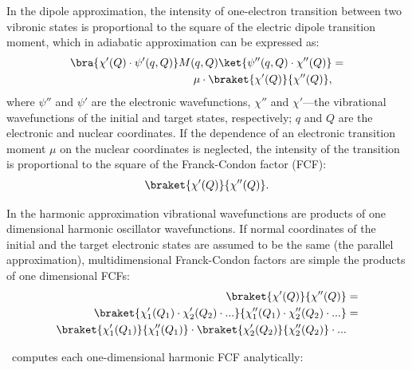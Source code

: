 \documentclass[11pt]{article}
\begin{document}
In the dipole approximation, the intensity of one-electron transition between two vibronic states
is proportional to the square of the electric dipole transition moment, which
in adiabatic approximation can be expressed as:
\begin{align}
\bra{\chi '(Q)\cdot\psi'(q,Q)} M(q,Q) \ket{\psi''(q,Q)\cdot\chi''(Q)} & = \nonumber\\
\mu \cdot \braket{\chi '(Q)}{\chi ''(Q)}, & 
\end{align}
where
$\psi''$ and $\psi'$ are the electronic wavefunctions, $\chi''$ and $\chi'$---the vibrational wavefunctions
of the initial and target states, respectively;
$q$ and $Q$ are the electronic and nuclear coordinates.
If the dependence 
of an electronic transition moment $\mu$  on the nuclear coordinates is neglected,
the intensity of the transition is proportional to the square of the 
Franck-Condon factor (FCF)\cite{Franck:25,Condon:26}:
\begin{align}
\braket{\chi '(Q)}{\chi ''(Q)}.
\end{align}

In the harmonic approximation vibrational wavefunctions are products of
one dimensional harmonic oscillator wavefunctions. 
If normal coordinates of the initial and the target electronic states are assumed to be the same
(the parallel approximation),
multidimensional Franck-Condon factors are simple the products of one dimensional FCFs:
\begin{align}
\braket{\chi'(Q)}{\chi''(Q)}&=\nonumber\\
\braket{\chi'_1(Q_1)\cdot\chi'_2(Q_2)\cdot...}{\chi''_1(Q_1)\cdot\chi''_2(Q_2)\cdot...}&=\nonumber\\
\braket{\chi'_1(Q_1)}{\chi''_1(Q_1)}\cdot\braket{\chi'_2(Q_2)}{\chi''_2(Q_2)}\cdot...&
\label{eq:product_fcf}
\end{align}

\ezFCF\ computes each one-dimensional harmonic FCF analytically\cite{FranckCondon:Math:30}:
\end{document}
